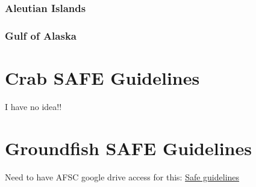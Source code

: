 \documentclass[
]{book}
\begin{document}
\hypertarget{aleutian-islands}{%
\subsection{Aleutian Islands}\label{aleutian-islands}}

\hypertarget{gulf-of-alaska}{%
\subsection{Gulf of Alaska}\label{gulf-of-alaska}}

\hypertarget{safe}{%
\chapter{Crab SAFE Guidelines}\label{safe}}

I have no idea!!

\hypertarget{groundfish-safe-guidelines}{%
\chapter{Groundfish SAFE Guidelines}\label{groundfish-safe-guidelines}}

Need to have AFSC google drive access for this:
\href{https://docs.google.com/document/d/1ykEGhbvwY7iKRTclUHb-hCObHLoWW6g2dF-pwb85_1o/edit\#heading=h.gjdgxs}{Safe guidelines}

  
\end{document}

